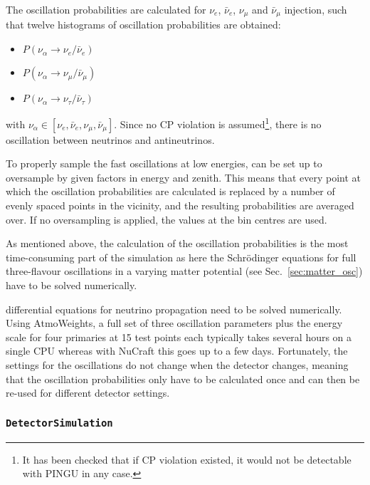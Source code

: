 The oscillation probabilities are calculated for $\nu_e$, $\bar\nu_e$, $\nu_\mu$
and $\bar\nu_\mu$ injection, such that twelve histograms of oscillation
probabilities are obtained:
\begin{itemize}
 \item $P(\nu_\alpha \to \nu_e/\bar\nu_e)$
 \item $P(\nu_\alpha \to \nu_\mu/\bar\nu_\mu)$
 \item $P(\nu_\alpha \to \nu_\tau/\bar\nu_\tau)$
\end{itemize}
with $\nu_\alpha \in \left[\nu_e,\bar\nu_e,\nu_\mu,\bar\nu_\mu\right]$. Since
no CP violation is assumed\footnote{It has been checked that if CP violation
existed, it would not be detectable with PINGU in any case.}, there is no
oscillation between neutrinos and antineutrinos.


To properly sample the fast oscillations at low energies, \papa can be set up
to oversample by given factors in energy and zenith. This means that every
point at which the oscillation probabilities are calculated is replaced by a
number of evenly spaced points in the vicinity, and the resulting probabilities
are averaged over. If no oversampling is applied, the values at the bin
centres are used.

As mentioned above, the calculation of the oscillation probabilities is the 
most time-consuming part of the simulation as here the Schr\"odinger equations 
for full three-flavour oscillations in a varying matter 
potential (see Sec.~\ref{sec:matter_osc}) have to be solved numerically.

differential equations for neutrino propagation need to be solved numerically.
Using AtmoWeights, a full set of three oscillation parameters plus the energy
scale for four primaries at 15 test points each typically takes several hours
on a single CPU whereas with NuCraft this goes up to a few days. Fortunately,
the settings for the oscillations do not change when the detector changes,
meaning that the oscillation probabilities only have to be calculated once and
can then be re-used for different detector settings.


\subsubsection{\texttt{DetectorSimulation}}

